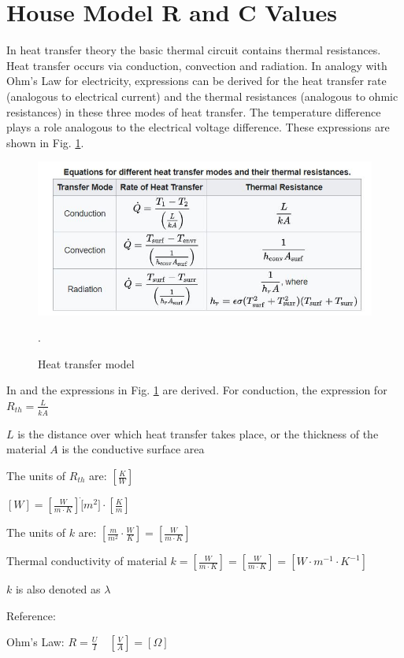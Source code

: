 \section{House Model R and C Values}

In heat transfer theory the basic thermal circuit contains thermal resistances. Heat transfer occurs via conduction, convection and radiation. In analogy with Ohm's Law for electricity, expressions can be derived for the heat transfer rate (analogous to electrical current) and the thermal resistances (analogous to ohmic resistances) in these three modes of heat transfer. The temperature difference plays a role analogous to the electrical voltage difference. These expressions are shown in Fig. \ref{fig:htr}.
\begin{figure}[H]
	\centering
	\includegraphics[width=0.8\columnwidth]{Pictures/heat transfer mode.JPG}
	\caption[Short title]{Heat transfer model \cite{GIGO}}.
	\label{fig:htr}
\end{figure}

In \cite{HTTHERMO} and \cite{FUND} the expressions in Fig. \ref{fig:htr} are derived.
For conduction, the expression for $R_{th} = \frac{L}{k\dot A}$

$L$ is the distance over which heat transfer takes place, or the thickness of the material
$A$ is the conductive surface area

The units of $R_{th}$ are: $ [\frac{K}{W}] $

$ [W] = [\frac{W}{m \cdot K}] \dot [m^2] \cdot [\frac{K}{m}] $

The units of $k$ are: $ [\frac{m}{m^2} \cdot \frac{W}{K}] = [\frac{W}{m \cdot K}]$

Thermal conductivity of material $k = [\frac{W}{m \cdot K }] = [\frac{W}{m \cdot K }]  = [W \cdot m^{-1} \cdot K^{-1}]$

$k$ is also denoted as $\lambda$

Reference: \cite{ELECRESCOND}

Ohm's Law: $ R = \frac{U}{I} \quad [\frac{V}{A}] = [\Omega] $

